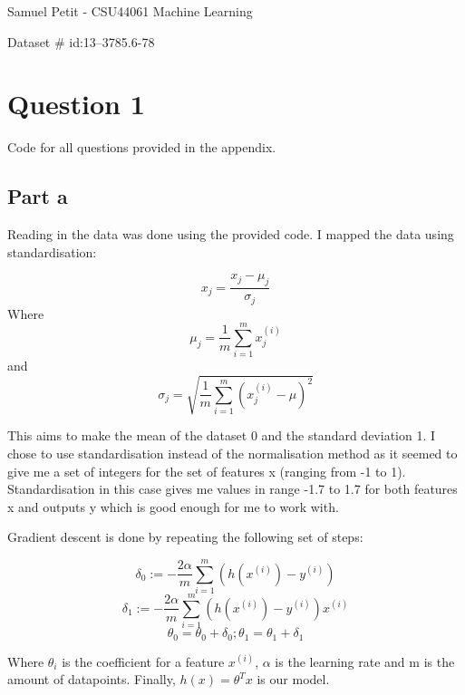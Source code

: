 \documentclass[10pt]{article}
\begin{document}
{\centering
    Samuel Petit - CSU44061 Machine Learning
    \par
    Dataset \# id:13--3785.6-78 
    \par
}
\section*{Question 1}
Code for all questions provided in the appendix.
\subsection*{Part a}
Reading in the data was done using the provided code. I mapped the data using
standardisation:

\begin{equation*}
    x_{j} = \frac{x_{j} - \mu_{j}}{\sigma_{j}} 
\end{equation*}
Where 
\begin{equation*}
    \mu_{j} = \frac{1}{m} \sum_{i=1}^{m}x_{j}^{(i)}
\end{equation*}
and
\begin{equation*}
    \sigma_{j} = \sqrt{\frac{1}{m}\sum_{i=1}^{m}(x_{j}^{(i)} - \mu)^{2}}
\end{equation*}

This aims to make the mean of the dataset 0 and the standard deviation 1.
I chose to use standardisation instead of the normalisation method as it seemed to give me a
set of integers for the set of features x (ranging from -1 to 1).
Standardisation in this case gives me values in 
range -1.7 to 1.7 for both features x and outputs y which is good enough for me to work with.

\vspace{5mm} %

Gradient descent is done by repeating the following set of steps:

\begin{equation*}
    \delta_{0} := - \frac{2\alpha}{m} \sum_{i=1}^{m}(h(x^{(i)}) - y^{(i)})
\end{equation*}
\begin{equation*}
    \delta_{1} := - \frac{2\alpha}{m} \sum_{i=1}^{m}(h(x^{(i)}) - y^{(i)})x^{(i)}
\end{equation*}
\begin{equation*}
    \theta_{0} = \theta_{0} + \delta_{0}; \theta_{1} = \theta_{1} + \delta_{1} 
\end{equation*}

Where $\theta_{i}$ is the coefficient for a feature $x^{(i)}$, $\alpha$ is the learning rate
and m is the amount of datapoints. Finally, $h(x) = \theta^{T}x$ is our model.
\end{document}

